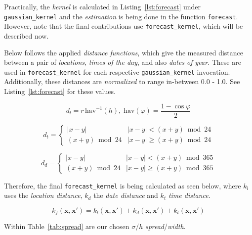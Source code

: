 \documentclass[a4paper, twocolumn]{article}
\begin{document}
    Practically, the \emph{kernel} is calculated in Listing~\ref{lst:forecast} under \texttt{gaussian\_kernel} and the \emph{estimation} is being done in the function \texttt{forecast}. However, note that the final contributions use \texttt{forecast\_kernel}, which will be described now.

    Below follows the applied \emph{distance functions}, which give the measured distance between a pair of \emph{locations}, \emph{times of the day}, and also \emph{dates of year}. These are used in \texttt{forecast\_kernel} for each respective \texttt{gaussian\_kernel} invocation. Additionally, these distances are \emph{normalized} to range in-between 0.0 - 1.0. See Listing~\ref{lst:forecast} for these values.

    \begin{equation*} \label{eq:location}
        d_l = r\, \mathrm{hav}^{-1}(h),\; \mathrm{hav}(\varphi) = \frac{1 - \cos\varphi}{2}
    \end{equation*}

    \begin{equation*} \label{eq:time}
        d_t = \begin{cases}
            |x - y| & |x - y| < (x + y) \bmod 24\\
            (x + y) \bmod 24 & |x - y| \geq (x + y) \bmod 24
        \end{cases}
    \end{equation*}

    \begin{equation*} \label{eq:day}
        d_d = \begin{cases}
            |x - y| & |x - y| < (x + y) \bmod 365\\
            (x + y) \bmod 24 & |x - y| \geq (x + y) \bmod 365
        \end{cases}
    \end{equation*}

    Therefore, the final \texttt{forecast\_kernel} is being calculated as seen below, where $k_l$ uses the \emph{location distance}, $k_d$ the \emph{date distance} and $k_t$ \emph{time distance}.

    \begin{equation*} \label{eq:forecast}
        k_f(\bm{x}, \bm{x'}) = k_l(\bm{x}, \bm{x'}) + k_d(\bm{x}, \bm{x'}) + k_t(\bm{x}, \bm{x'})
    \end{equation*}

    Within Table~\ref{tab:spread} are our chosen $\sigma$/$h$ \emph{spread}/\emph{width}.
\end{document}
